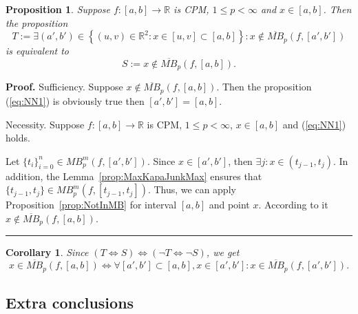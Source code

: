 \documentclass[12pt, a4paper]{article}
\newtheorem{proposition}[theorem]{Proposition}
\newtheorem{corollary}[theorem]{Corollary}
\newenvironment{proof}[1][Proof]{\noindent \textbf{#1.} }{\  \rule{0.5em}{0.5em}}
\numberwithin{equation}{section}
\begin{document}
\begin{proposition}\label{prop:non_non}
  Suppose $f:[a,b] \rightarrow \mathbb{R}$ is CPM,
  $1 \leq p < \infty$ and $x \in [a,b]$. Then the proposition
  \begin{equation}\label{eq:NN1}
    T:=\exists (a',b') \in \left\{ (u,v) \in \mathbb{R}^2: x \in [u,v] \subset [a,b]\right\}: x \notin \overline{MB}_p(f,[a',b'])
  \end{equation}
  is equivalent to
  \begin{equation}\label{eq:NN2}
   S:= x \not\in \overline{MB}_p(f,[a,b]).
  \end{equation}
\end{proposition}
\begin{proof}
  Sufficiency. Suppose $ x \notin \overline{MB}_p(f,[a,b])$. 
  Then the proposition (\ref{eq:NN1}) is obviously true then
  $[a',b'] = [a,b]$.
  
  Necessity.
  Suppose $f:[a,b] \rightarrow \mathbb{R}$ is CPM,
  $1 \leq p < \infty$, $x \in [a,b]$ and (\ref{eq:NN1}) holds.

  
  Let $\{t_i\}_{i=0}^n \in MB_{p}^m(f,[a',b'])$. 
  Since $x \in [a',b']$, then $\exists j: x \in (t_{j-1},t_j)$. 
  In addition, the Lemma~\ref{prop:MaxKapaJunkMax} ensures that $\{t_{j-1},t_j\} \in MB_{p}^m(f,[t_{j-1},t_j])$.
  Thus, we can apply Proposition~\ref{prop:NotInMB} for interval $[a,b]$ and point $x$. 
  According to it $x \notin \overline{MB}_p(f,[a,b])$.
\end{proof}
\begin{corollary}\label{cor:non_non}
  Since $(T \Leftrightarrow S) \Leftrightarrow (\neg T \Leftrightarrow \neg S) $, we get
  $$ x \in \overline{MB}_p(f,[a,b]) \Leftrightarrow \forall [a',b'] \subset [a,b], x \in [a',b']: x \in \overline{MB}_p(f,[a',b']). $$
\end{corollary}

\subsection{Extra conclusions}
\end{document}
